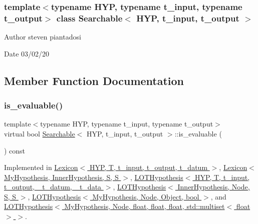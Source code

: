 \subsubsection*{template$<$typename H\+YP, typename t\+\_\+input, typename t\+\_\+output$>$\newline
class Searchable$<$ H\+Y\+P, t\+\_\+input, t\+\_\+output $>$}

\begin{DoxyAuthor}{Author}
steven piantadosi 
\end{DoxyAuthor}
\begin{DoxyDate}{Date}
03/02/20 
\end{DoxyDate}


\subsection{Member Function Documentation}
\mbox{\label{class_searchable_aae16f1cb01f140f4033f6f67dc9753b6}} 
\subsubsection{\texorpdfstring{is\+\_\+evaluable()}{is\_evaluable()}}
{\footnotesize\ttfamily template$<$typename H\+YP, typename t\+\_\+input, typename t\+\_\+output$>$ \\
virtual bool \hyperlink{class_searchable}{Searchable}$<$ H\+YP, t\+\_\+input, t\+\_\+output $>$\+::is\+\_\+evaluable (\begin{DoxyParamCaption}{ }\end{DoxyParamCaption}) const\hspace{0.3cm}{\ttfamily [pure virtual]}}



Implemented in \hyperlink{class_lexicon_a4928f2db73eb7d675f347429a4167820}{Lexicon$<$ H\+Y\+P, T, t\+\_\+input, t\+\_\+output, t\+\_\+datum $>$}, \hyperlink{class_lexicon_a4928f2db73eb7d675f347429a4167820}{Lexicon$<$ My\+Hypothesis, Inner\+Hypothesis, S, S $>$}, \hyperlink{class_l_o_t_hypothesis_a68dedaeae92b25b0450f2dc1bd95a35b}{L\+O\+T\+Hypothesis$<$ H\+Y\+P, T, t\+\_\+input, t\+\_\+output, \+\_\+t\+\_\+datum, \+\_\+t\+\_\+data $>$}, \hyperlink{class_l_o_t_hypothesis_a68dedaeae92b25b0450f2dc1bd95a35b}{L\+O\+T\+Hypothesis$<$ Inner\+Hypothesis, Node, S, S $>$}, \hyperlink{class_l_o_t_hypothesis_a68dedaeae92b25b0450f2dc1bd95a35b}{L\+O\+T\+Hypothesis$<$ My\+Hypothesis, Node, Object, bool $>$}, and \hyperlink{class_l_o_t_hypothesis_a68dedaeae92b25b0450f2dc1bd95a35b}{L\+O\+T\+Hypothesis$<$ My\+Hypothesis, Node, float, float, float, std\+::multiset$<$ float $>$ $>$}.

